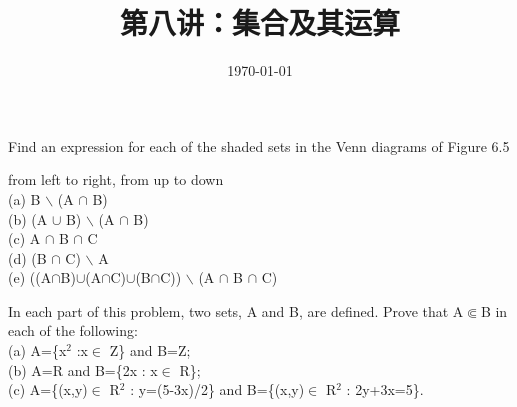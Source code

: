 \documentclass[11pt, a4paper, UTF8]{ctexart}
\title{第八讲：集合及其运算}
\date{\today}     %
\begin{document}
\maketitle
\noplagiarism	%
\beginthishw	%

\begin{problem}[UD: 6.7]
Find an expression for each of the shaded sets in the Venn diagrams of Figure 6.5
\end{problem}

\begin{solution}
from left to right, from up to down\\
(a) B $\backslash$ (A $\cap$ B)\\
(b) (A $\cup$ B) $\backslash$ (A $\cap$ B)\\
(c) A $\cap$ B $\cap$ C\\
(d) (B $\cap$ C) $\backslash$ A\\
(e)  ((A$\cap$B)$\cup$(A$\cap$C)$\cup$(B$\cap$C)) $\backslash$ (A $\cap$ B $\cap$ C)
\end{solution}


\begin{problem}[UD: 6.16]
In each part of this problem, two sets, A and B, are defined. Prove that A$\Subset$B in each of the following:\\
(a) A=\{x$^2$ :x$\in$ Z\} and B=Z;\\
(b) A=R and B=\{2x : x$\in$ R\};\\
(c) A=\{(x,y)$\in$ R$^2$ : y=(5-3x)/2\} and B=\{(x,y)$\in$ R$^2$ : 2y+3x=5\}.\\
\end{problem}
\end{document}
